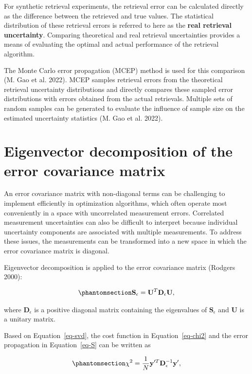 \documentclass[
  11pt,
  letterpaper,
  DIV=11,
  numbers=noendperiod]{scrreprt}
\begin{document}
For synthetic retrieval experiments, the retrieval error can be
calculated directly as the difference between the retrieved and true
values. The statistical distribution of these retrieval errors is
referred to here as the \textbf{real retrieval uncertainty}. Comparing
theoretical and real retrieval uncertainties provides a means of
evaluating the optimal and actual performance of the retrieval
algorithm.

The Monte Carlo error propagation (MCEP) method is used for this
comparison (M. Gao et al. 2022). MCEP samples retrieval errors from the
theoretical retrieval uncertainty distributions and directly compares
these sampled error distributions with errors obtained from the actual
retrievals. Multiple sets of random samples can be generated to evaluate
the influence of sample size on the estimated uncertainty statistics (M.
Gao et al. 2022).

\section{Eigenvector decomposition of the error covariance
matrix}\label{sec-transform}

An error covariance matrix with non-diagonal terms can be challenging to
implement efficiently in optimization algorithms, which often operate
most conveniently in a space with uncorrelated measurement errors.
Correlated measurement uncertainties can also be difficult to interpret
because individual uncertainty components are associated with multiple
measurements. To address these issues, the measurements can be
transformed into a new space in which the error covariance matrix is
diagonal.

Eigenvector decomposition is applied to the error covariance matrix
(Rodgers 2000):

\begin{equation}\phantomsection\label{eq-svd}{
\mathbf{S}_{\epsilon}
=
\mathbf{U}^{T}
\mathbf{D}_{\epsilon}
\mathbf{U},
}\end{equation}

where \(\mathbf{D}_{\epsilon}\) is a positive diagonal matrix containing
the eigenvalues of \(\mathbf{S}_{\epsilon}\) and \(\mathbf{U}\) is a
unitary matrix.

Based on Equation~\ref{eq-svd}, the cost function in
Equation~\ref{eq-chi2} and the error propagation in Equation~\ref{eq-S}
can be written as

\begin{equation}\phantomsection\label{eq-chi2-new}{
\chi^2
=
\frac{1}{N}
\mathbf{y}'^{T}
\mathbf{D}_{\epsilon}^{-1}
\mathbf{y}',
}\end{equation}
\end{document}
